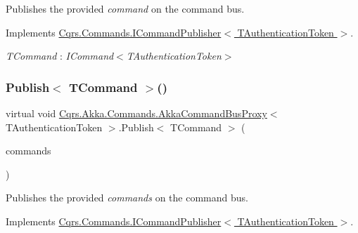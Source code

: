 Publishes the provided {\itshape command}  on the command bus. 



Implements \hyperlink{interfaceCqrs_1_1Commands_1_1ICommandPublisher_aeeb487ad5686d9c44d214b1daaf7833a}{Cqrs.\+Commands.\+I\+Command\+Publisher$<$ T\+Authentication\+Token $>$}.

\begin{Desc}
\item[Type Constraints]\begin{description}
\item[{\em T\+Command} : {\em I\+Command$<$T\+Authentication\+Token$>$}]\end{description}
\end{Desc}
\mbox{\label{classCqrs_1_1Akka_1_1Commands_1_1AkkaCommandBusProxy_a81dc8162ca933d84b6aee04aff589010}} 
\subsubsection{\texorpdfstring{Publish$<$ T\+Command $>$()}{Publish< TCommand >()}\hspace{0.1cm}{\footnotesize\ttfamily [2/2]}}
{\footnotesize\ttfamily virtual void \hyperlink{classCqrs_1_1Akka_1_1Commands_1_1AkkaCommandBusProxy}{Cqrs.\+Akka.\+Commands.\+Akka\+Command\+Bus\+Proxy}$<$ T\+Authentication\+Token $>$.Publish$<$ T\+Command $>$ (\begin{DoxyParamCaption}\item[{I\+Enumerable$<$ T\+Command $>$}]{commands }\end{DoxyParamCaption})\hspace{0.3cm}{\ttfamily [virtual]}}



Publishes the provided {\itshape commands}  on the command bus. 



Implements \hyperlink{interfaceCqrs_1_1Commands_1_1ICommandPublisher_af0f033c0b949e5650032e4f00b11b595}{Cqrs.\+Commands.\+I\+Command\+Publisher$<$ T\+Authentication\+Token $>$}.

